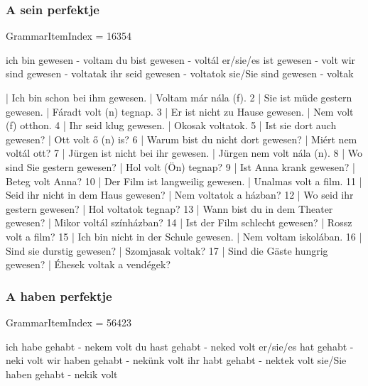 \documentclass{article}
\newenvironment{desc}{\verbatim}{\endverbatim}
\newenvironment{exmp}{\verbatim}{\endverbatim}
\begin{document}
\subsubsection{A sein perfektje}

GrammarItemIndex = 16354

\begin{desc}
ich bin gewesen - voltam
du bist gewesen - voltál
er/sie/es ist gewesen - volt
wir sind gewesen - voltatak
ihr seid gewesen - voltatok
sie/Sie sind gewesen - voltak
\end{desc}

\begin{exmp}
1 | Ich bin schon bei ihm gewesen. | Voltam már nála (f).
2 | Sie ist müde gestern gewesen. | Fáradt volt (n) tegnap.
3 | Er ist nicht zu Hause gewesen. | Nem volt (f) otthon.
4 | Ihr seid klug gewesen. | Okosak voltatok.
5 | Ist sie dort auch gewesen? | Ott volt ő (n) is?
6 | Warum bist du nicht dort gewesen? | Miért nem voltál ott?
7 | Jürgen ist nicht bei ihr gewesen. | Jürgen nem volt nála (n).
8 | Wo sind Sie gestern gewesen? | Hol volt (Ön) tegnap?
9 | Ist Anna krank gewesen? | Beteg volt Anna?
10 | Der Film ist langweilig gewesen. | Unalmas volt a film.
11 | Seid ihr nicht in dem Haus gewesen? | Nem voltatok a házban?
12 | Wo seid ihr gestern gewesen? | Hol voltatok tegnap?
13 | Wann bist du in dem Theater gewesen? | Mikor voltál színházban?
14 | Ist der Film schlecht gewesen? | Rossz volt a film?
15 | Ich bin nicht in der Schule gewesen. | Nem voltam iskolában.
16 | Sind sie durstig gewesen? | Szomjasak voltak?
17 | Sind die Gäste hungrig gewesen? | Éhesek voltak a vendégek?
\end{exmp}

\subsubsection{A haben perfektje}

GrammarItemIndex = 56423

\begin{desc}

ich habe gehabt - nekem volt
du hast gehabt - neked volt
er/sie/es hat gehabt - neki volt
wir haben gehabt - nekünk volt
ihr habt gehabt - nektek volt
sie/Sie haben gehabt - nekik volt

\end{desc}

\begin{exmp}
\end{exmp}
\end{document}
